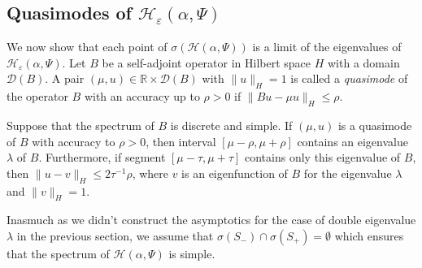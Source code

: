 \documentclass[11pt,english]{amsart}
\begin{document}
\subsection{Quasimodes of $\mathcal{H}_{\varepsilon}(\alpha,\Psi)$}
We now show that each  point of $\sigma(\mathcal{H}(\alpha,\Psi))$ is a limit of
the eigenvalues of  $\mathcal{H}_{\varepsilon}(\alpha,\Psi)$.
Let $B$ be a self-adjoint operator in Hilbert space  $H$ with a domain
$\mathcal{D}(B)$. A pair $(\mu, u)\in \mathbb{R}\times\mathcal{D}(B)$ with $\|u\|_H=1$
is called a \emph{quasimode} of the operator $B$ with an accuracy up to $\rho>0$ if $\|Bu-\mu u\|_H\leq \rho$.

\begin{g_lemma}\label{LemmaVishik} Suppose that the spectrum of $B$ is discrete and simple. If $(\mu, u)$ is a quasimode of $B$ with accuracy to $\rho>0$, then interval  $[\mu-\rho,\mu+\rho]$ contains an eigenvalue $\lambda$ of $B$.
Furthermore, if segment $[\mu-\tau,\mu+\tau]$ contains only this eigenvalue of $B$, then $\|u-v\|_H\leq 2\tau^{-1}\rho$, where $v$ is an eigenfunction of $B$ for the eigenvalue $\lambda$ and $\|v\|_H=1$.
\rm{\cite{LazutkinVINITI34, VishykLust}}
\end{g_lemma}

Inasmuch as we didn't construct the asymptotics for the case of double eigenvalue $\lambda$ in the previous section, we assume that $\sigma(S_-)\cap\sigma(S_+)=\emptyset$ which ensures that  the spectrum of $\mathcal{H}(\alpha,\Psi)$ is simple.
\end{document}
